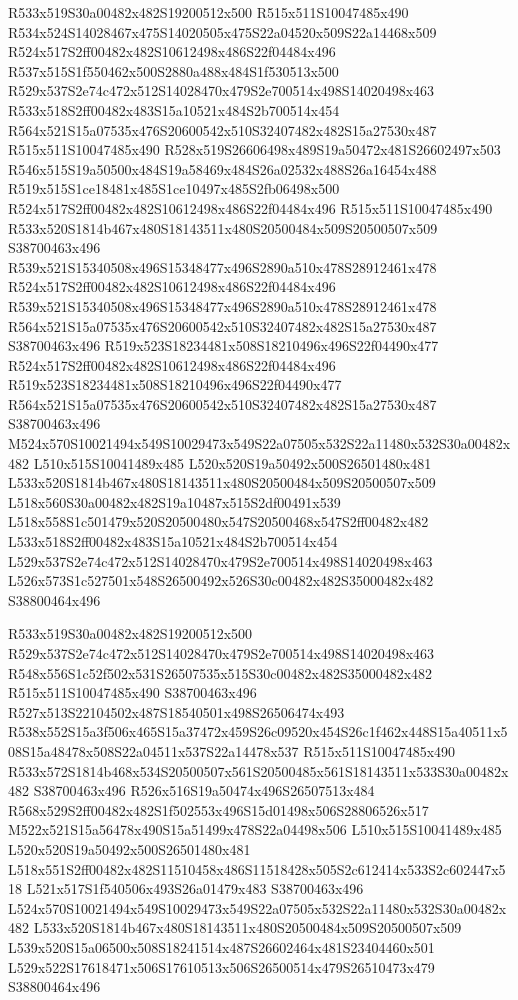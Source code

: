 \documentclass{article}
\begin{document}
\begin{multicols}{2}
R533x519S30a00482x482S19200512x500 R515x511S10047485x490 R534x524S14028467x475S14020505x475S22a04520x509S22a14468x509 R524x517S2ff00482x482S10612498x486S22f04484x496 R537x515S1f550462x500S2880a488x484S1f530513x500 R529x537S2e74c472x512S14028470x479S2e700514x498S14020498x463 R533x518S2ff00482x483S15a10521x484S2b700514x454 R564x521S15a07535x476S20600542x510S32407482x482S15a27530x487 R515x511S10047485x490 R528x519S26606498x489S19a50472x481S26602497x503 R546x515S19a50500x484S19a58469x484S26a02532x488S26a16454x488 R519x515S1ce18481x485S1ce10497x485S2fb06498x500 R524x517S2ff00482x482S10612498x486S22f04484x496 R515x511S10047485x490 R533x520S1814b467x480S18143511x480S20500484x509S20500507x509 S38700463x496 R539x521S15340508x496S15348477x496S2890a510x478S28912461x478 R524x517S2ff00482x482S10612498x486S22f04484x496 R539x521S15340508x496S15348477x496S2890a510x478S28912461x478 R564x521S15a07535x476S20600542x510S32407482x482S15a27530x487 S38700463x496 R519x523S18234481x508S18210496x496S22f04490x477 R524x517S2ff00482x482S10612498x486S22f04484x496 R519x523S18234481x508S18210496x496S22f04490x477 R564x521S15a07535x476S20600542x510S32407482x482S15a27530x487 S38700463x496 M524x570S10021494x549S10029473x549S22a07505x532S22a11480x532S30a00482x482 L510x515S10041489x485 L520x520S19a50492x500S26501480x481 L533x520S1814b467x480S18143511x480S20500484x509S20500507x509 L518x560S30a00482x482S19a10487x515S2df00491x539 L518x558S1c501479x520S20500480x547S20500468x547S2ff00482x482 L533x518S2ff00482x483S15a10521x484S2b700514x454 L529x537S2e74c472x512S14028470x479S2e700514x498S14020498x463 L526x573S1c527501x548S26500492x526S30c00482x482S35000482x482 S38800464x496

R533x519S30a00482x482S19200512x500 R529x537S2e74c472x512S14028470x479S2e700514x498S14020498x463 R548x556S1c52f502x531S26507535x515S30c00482x482S35000482x482 R515x511S10047485x490 S38700463x496 R527x513S22104502x487S18540501x498S26506474x493 R538x552S15a3f506x465S15a37472x459S26c09520x454S26c1f462x448S15a40511x508S15a48478x508S22a04511x537S22a14478x537 R515x511S10047485x490 R533x572S1814b468x534S20500507x561S20500485x561S18143511x533S30a00482x482 S38700463x496 R526x516S19a50474x496S26507513x484 R568x529S2ff00482x482S1f502553x496S15d01498x506S28806526x517 M522x521S15a56478x490S15a51499x478S22a04498x506 L510x515S10041489x485 L520x520S19a50492x500S26501480x481 L518x551S2ff00482x482S11510458x486S11518428x505S2c612414x533S2c602447x518 L521x517S1f540506x493S26a01479x483 S38700463x496 L524x570S10021494x549S10029473x549S22a07505x532S22a11480x532S30a00482x482 L533x520S1814b467x480S18143511x480S20500484x509S20500507x509 L539x520S15a06500x508S18241514x487S26602464x481S23404460x501 L529x522S17618471x506S17610513x506S26500514x479S26510473x479 S38800464x496


\end{multicols}
\end{document}
